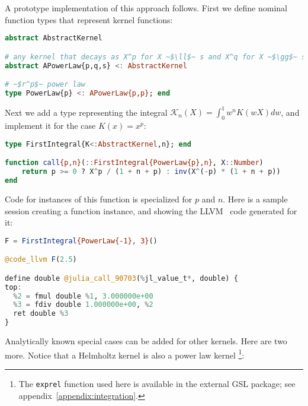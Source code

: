 A prototype implementation of this approach follows.
First we define nominal function types that represent kernel functions:

\begin{singlespace}
\begin{lstlisting}[language=julia]
abstract AbstractKernel

# any kernel that decays as X^p for X ~$\ll$~ s and X^q for X ~$\gg$~ s
abstract APowerLaw{p,q,s} <: AbstractKernel

# ~$r^p$~ power law
type PowerLaw{p} <: APowerLaw{p,p}; end
\end{lstlisting}
\end{singlespace}

\noindent
Next we add a type representing the integral
$\mathcal{K}_n(X) = \int_0^1 w^n K(wX) dw$, and implement it for the
case $K(x) = x^p$:

\begin{singlespace}
\begin{lstlisting}[language=julia]
type FirstIntegral{K<:AbstractKernel,n}; end

function call{p,n}(::FirstIntegral{PowerLaw{p},n}, X::Number)
    return p >= 0 ? X^p / (1 + n + p) : inv(X^(-p) * (1 + n + p))
end
\end{lstlisting}
\end{singlespace}

Code for instances of this function is specialized for $p$ and $n$.
Here is a sample session creating a function instance, and showing the
LLVM~\cite{LLVM} code generated for it:

\begin{singlespace}
\begin{lstlisting}[language=julia]
F = FirstIntegral{PowerLaw{-1}, 3}()

@code_llvm F(2.5)

define double @julia_call_90703(%jl_value_t*, double) {
top:
  %2 = fmul double %1, 3.000000e+00
  %3 = fdiv double 1.000000e+00, %2
  ret double %3
}
\end{lstlisting}
\end{singlespace}

Analytically known special cases can be added for other kernels.
Here are two more.
Notice that a Helmholtz kernel is also a power law kernel
\footnote{The \texttt{exprel} function used here is available in the
external GSL package; see appendix~\ref{appendix:integration}.}:

